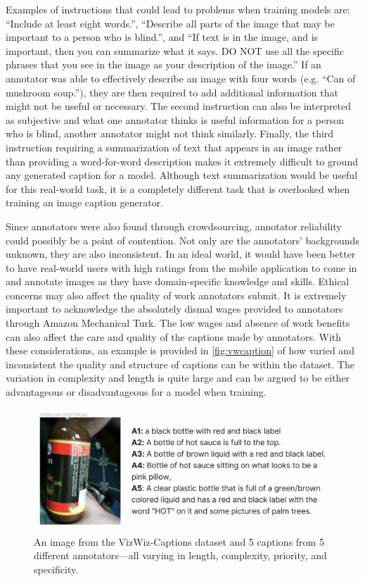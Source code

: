 \documentclass[11pt,a4paper]{article}
\begin{document}
Examples of instructions that could lead to problems when training models are: “Include at least eight words.”, “Describe all parts of the image that may be important to a person who is blind.”, and “If text is in the image, and is important, then you can summarize what it says. DO NOT use all the specific phrases that you see in the image as your description of the image.” \citep{Gurari-2020-captioning} If an annotator was able to effectively describe an image with four words (e.g. “Can of mushroom soup.”), they are then required to add additional information that might not be useful or necessary. The second instruction can also be interpreted as subjective and what one annotator thinks is useful information for a person who is blind, another annotator might not think similarly. Finally, the third instruction requiring a summarization of text that appears in an image rather than providing a word-for-word description makes it extremely difficult to ground any generated caption for a model. Although text summarization would be useful for this real-world task, it is a completely different task that is overlooked when training an image caption generator. 

Since annotators were also found through crowdsourcing, annotator reliability could possibly be a point of contention. Not only are the annotators’ backgrounds unknown, they are also inconsistent. In an ideal world, it would have been better to have real-world users with high ratings from the mobile application to come in and annotate images as they have domain-specific knowledge and skills. Ethical concerns may also affect the quality of work annotators submit. It is extremely important to acknowledge the absolutely dismal wages provided to annotators through Amazon Mechanical Turk. \citep{hara2018amazon} The low wages and absence of work benefits can also affect the care and quality of the captions made by annotators. With these considerations, an example is provided in \autoref{fig:vwcaption} of how varied and inconsistent the quality and structure of captions can be within the dataset. The variation in complexity and length is quite large and can be argued to be either advantageous or disadvantageous for a model when training. 

\begin{figure}[ht]
  \includegraphics[width=\linewidth]{VizWiz_train_00011794_captioned.png}
  \caption{An image from the VizWiz-Captions dataset and 5 captions from 5 different annotators—all varying in length, complexity, priority, and specificity.}
  \label{fig:vwcaption}
\end{figure}
\end{document}
